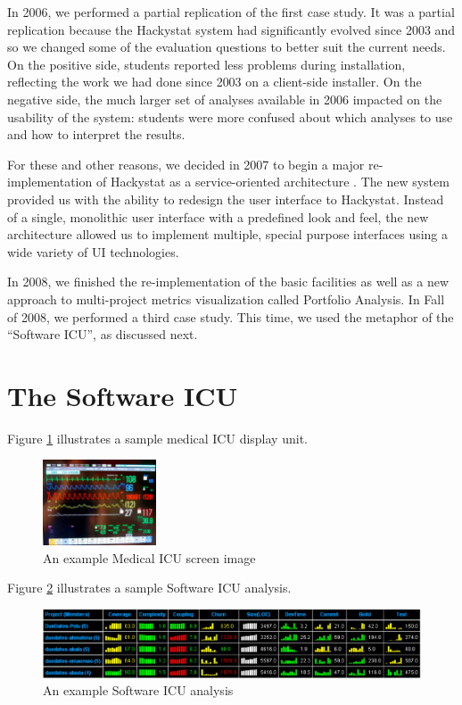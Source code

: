 \documentclass{acm_proc_article-sp}
\begin{document}
In 2006, we performed a partial replication of the first case study.  It
was a partial replication because the Hackystat system had significantly
evolved since 2003 and so we changed some of the evaluation questions to
better suit the current needs.  On the positive side, students reported
less problems during installation, reflecting the work we had done since
2003 on a client-side installer.  On the negative side, the much larger set
of analyses available in 2006 impacted on the usability of the system:
students were more confused about which analyses to use and how to
interpret the results.

For these and other reasons, we decided in 2007 to begin a major
re-implementation of Hackystat as a service-oriented architecture
\cite{csdl2-09-07}. The new system provided us with the ability to redesign
the user interface to Hackystat.  Instead of a single, monolithic user
interface with a predefined look and feel, the new architecture allowed us
to implement multiple, special purpose interfaces using a wide variety of
UI technologies.  

In 2008, we finished the re-implementation of the basic facilities as well
as a new approach to multi-project metrics visualization called Portfolio
Analysis.  In Fall of 2008, we performed a third case study. This time, we used 
the metaphor of the ``Software ICU'', as discussed next.

\section{The Software ICU}
\label{sec:icu}

Figure \ref{fig:micu} illustrates a sample medical ICU display unit. 

\begin{figure}[ht]
  \center
  \includegraphics[width=0.3\textwidth]{micu-screen.eps}
  \caption{An example Medical ICU screen image}
  \label{fig:micu}
\end{figure} 

Figure \ref{fig:sicu} illustrates a sample Software ICU analysis. 

\begin{figure}[ht]
  \center
  \includegraphics[width=\textwidth]{portfolio-2008.eps}
  \caption{An example Software ICU analysis}
  \label{fig:sicu}
\end{figure} 
\end{document}
